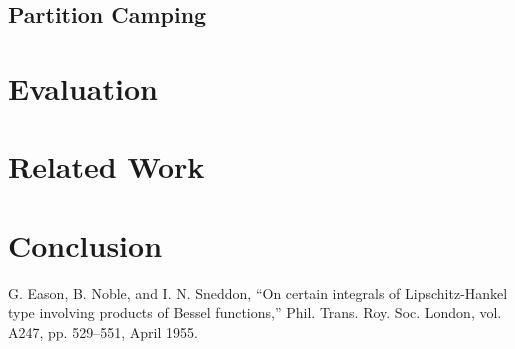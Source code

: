 \documentclass[conference]{IEEEtran}
\begin{document}
		
	\subsection{Partition Camping}
		

\section{Evaluation}

	
	
\section{Related Work}

\section{Conclusion}

\begin{thebibliography}{00}
 G. Eason, B. Noble, and I. N. Sneddon, ``On certain integrals of Lipschitz-Hankel type involving products of Bessel functions,'' Phil. Trans. Roy. Soc. London, vol. A247, pp. 529--551, April 1955.

\end{thebibliography}
\end{document}
